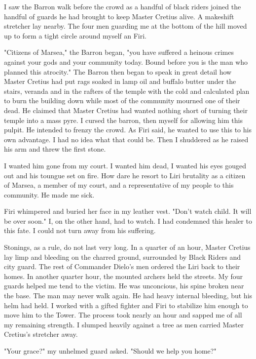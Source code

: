 \documentclass{article}
\begin{document}
I saw the Barron walk before the crowd as a handful of black riders joined the handful of guards he had brought to keep Master Cretius alive. A makeshift stretcher lay nearby. The four men guarding me at the bottom of the hill moved up to form a tight circle around myself an Firi. 

"Citizens of Marsea," the Barron began, "you have suffered a heinous crimes against your gods and your community today. Bound before you is the man who planned this atrocity." The Barron then began to speak in great detail how Master Cretius had put rags soaked in lamp oil and buffalo butter under the stairs, veranda and in the rafters of the temple with the cold and calculated plan to burn the building down while most of the community mourned one of their dead. He claimed that Master Cretius had wanted nothing short of turning their temple into a mass pyre. I cursed the barron, then myself for allowing him this pulpit. He intended to frenzy the crowd. As Firi said, he wanted to use this to his own advantage. I had no idea what that could be. Then I shuddered as he raised his arm and threw the first stone. 

I wanted him gone from my court. I wanted him dead, I wanted his eyes gouged out and his toungue set on fire. How dare he resort to Liri brutality as a citizen of Marsea, a member of my court, and a representative of my people to this community. He made me sick. 

Firi whimpered and buried her face in my leather vest. "Don't watch child. It will be over soon." I, on the other hand, had to watch. I had condemned this healer to this fate. I could not turn away from his suffering.

Stonings, as a rule, do not last very long. In a quarter of an hour, Master Cretius lay limp and bleeding on the charred ground, surrounded by Black Riders and city guard. The rest of Commander Dielo's men ordered the Liri back to their homes. In another quarter hour, the mounted archers held the streets. My four guards helped me tend to the victim. He was unconcious, his spine broken near the base. The man may never walk again. He had heavy internal bleeding, but his helm had held. I worked with a gifted fighter and Firi to stabilize him enough to move him to the Tower. The process took nearly an hour and sapped me of all my remaining strength. I slumped heavily against a tree as men carried Master Cretius's stretcher away.

"Your grace?" my unhelmed guard asked. "Should we help you home?"
\end{document}

